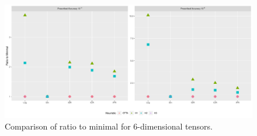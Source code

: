 \documentclass[runningheads]{llncs}
\begin{document}
\begin{figure}[!htb]
	\begin{center}
		\includegraphics[scale=0.35]{./ratio_to_minimal-16-6.pdf}
	\end{center}
	\caption{Comparison of ratio to minimal for $6$-dimensional tensors.\label{fig:rtm-6}}
\end{figure}



\end{document}
